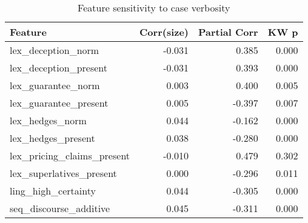 \begin{table}[htbp]
\centering
\caption{Feature sensitivity to case verbosity}
\label{tab:size_bias}
\begin{tabular}{lrrr}
\toprule
Feature & Corr(size) & Partial Corr & KW p \\
\midrule
lex\_deception\_norm & -0.031 & 0.385 & 0.000 \\
lex\_deception\_present & -0.031 & 0.393 & 0.000 \\
lex\_guarantee\_norm & 0.003 & 0.400 & 0.005 \\
lex\_guarantee\_present & 0.005 & -0.397 & 0.007 \\
lex\_hedges\_norm & 0.044 & -0.162 & 0.000 \\
lex\_hedges\_present & 0.038 & -0.280 & 0.000 \\
lex\_pricing\_claims\_present & -0.010 & 0.479 & 0.302 \\
lex\_superlatives\_present & 0.000 & -0.296 & 0.011 \\
ling\_high\_certainty & 0.044 & -0.305 & 0.000 \\
seq\_discourse\_additive & 0.045 & -0.311 & 0.000 \\
\bottomrule
\end{tabular}
\end{table}

